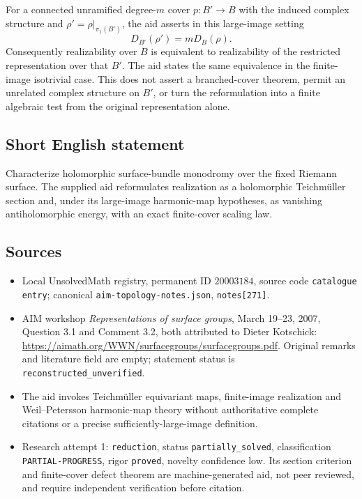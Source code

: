 \documentclass[11pt]{article}
\begin{document}
For a connected unramified degree-$m$ cover $p:B'\to B$ with the induced complex structure and $\rho'=\rho|_{\pi_1(B')}$, the aid asserts in this large-image setting
\[
D_{B'}(\rho')=mD_B(\rho).
\]
Consequently realizability over $B$ is equivalent to realizability of the restricted representation over that $B'$. The aid states the same equivalence in the finite-image isotrivial case. This does not assert a branched-cover theorem, permit an unrelated complex structure on $B'$, or turn the reformulation into a finite algebraic test from the original representation alone.
\subsection{Short English statement}
Characterize holomorphic surface-bundle monodromy over the fixed Riemann surface. The supplied aid reformulates realization as a holomorphic Teichm\"uller section and, under its large-image harmonic-map hypotheses, as vanishing antiholomorphic energy, with an exact finite-cover scaling law.
\subsection{Sources}
\begin{itemize}
\item Local UnsolvedMath registry, permanent ID $20003184$, source code \texttt{catalogue entry}; canonical \texttt{aim-topology-notes.json}, \texttt{notes[271]}.
\item AIM workshop \emph{Representations of surface groups}, March 19--23, 2007, Question 3.1 and Comment 3.2, both attributed to Dieter Kotschick: \url{https://aimath.org/WWN/surfacegroups/surfacegroups.pdf}. Original remarks and literature field are empty; statement status is \texttt{reconstructed\_unverified}.
\item The aid invokes Teichm\"uller equivariant maps, finite-image realization and Weil--Petersson harmonic-map theory without authoritative complete citations or a precise sufficiently-large-image definition.
\item Research attempt 1: \texttt{reduction}, status \texttt{partially\_solved}, classification \texttt{PARTIAL-PROGRESS}, rigor \texttt{proved}, novelty confidence low. Its section criterion and finite-cover defect theorem are machine-generated aid, not peer reviewed, and require independent verification before citation.
\end{itemize}
\end{document}
